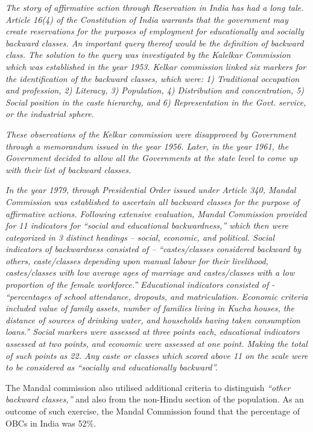 \begin{multicols}{2}
\noi
\textit{The story of affirmative action through Reservation in India has had a long tale. Article  16(4) of the Constitution of India warrants that the government may create reservations for the purposes of employment for educationally and socially backward classes. An important query thereof would be the definition of backward class. The solution to the query was investigated by the Kalelkar Commission which was established in the year 1953. Kelkar commission linked six markers for the identification of the backward classes, which were: 1) Traditional occupation and profession, 2) Literacy, 3) Population, 4) Distribution and concentration, 5) Social position in the caste hierarchy, and 6) Representation in the Govt. service, or the industrial sphere.}

\noi
\textit{These observations of the Kelkar commission were disapproved by Government through a memorandum issued in the year 1956. Later, in the year 1961, the Government decided to allow all the Governments at the state level to come up with their list of backward classes.}

\noi
\textit{In the year 1979, through Presidential Order issued under Article 340, Mandal Commission was established to ascertain all backward classes for the purpose of affirmative actions. Following extensive evaluation, Mandal Commission provided for 11 indicators for “social and educational backwardness,” which then were categorized in 3 distinct headings – social, economic, and political. Social indicators of backwardness consisted of – “castes/classes considered backward by others, caste/classes depending upon manual labour for their livelihood, castes/classes with low average ages of marriage and castes/classes with a low proportion of the female workforce.” Educational indicators consisted of - “percentages of school attendance, dropouts, and matriculation. Economic criteria included value of family assets, number of families living in Kucha houses, the distance of sources of drinking water, and households having taken consumption loans.” Social markers were assessed at three points each, educational indicators assessed at two points, and economic were assessed at one point. Making the total of such points as 22. Any caste or classes which scored above 11 on the scale were to be considered as “socially and educationally backward”.}

\noi
The Mandal commission also utilised additional criteria to distinguish \textit{“other backward classes,”} and also from the non-Hindu section of the population. As an outcome of such exercise, the Mandal Commission found that the percentage of OBCs in India was 52\%.


\end{multicols}
